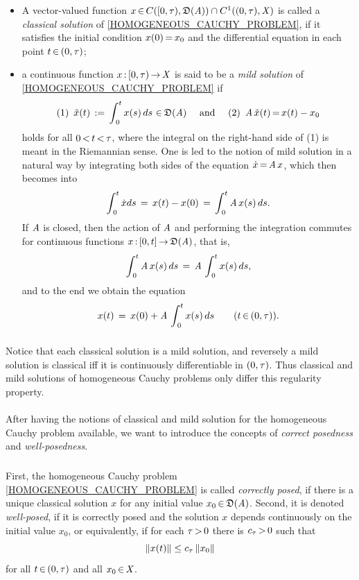 \documentclass[11pt,twoside]{article}
\begin{document}
\begin{itemize}[leftmargin=12pt]
\item[1.]
A vector-valued function
$x {\,\in\,} C([0,\tau),\mathfrak{D}(\mathit{A})) \cap C^1((0,\tau),\mathit{X})$
is called a \textit{classical solution} of \eqref{HOMOGENEOUS_CAUCHY_PROBLEM},
if it satisfies the initial condition $x(0) {\,=\,} x_0$
and the differential equation in each point $t {\,\in\,} (0,\tau)$;

\item[2.]
a continuous function $x {\,:\,} [0,\tau) {\,\to\,} \mathit{X}$ is said to be
a \textit{mild solution} of \eqref{HOMOGENEOUS_CAUCHY_PROBLEM} if
\[
\mbox{(1) } \, \tilde{x}(t) \,:=\,
\int_{\,0}^t x(s) \, ds \, {\,\in\,} \mathfrak{D}(\mathit{A})
\quad \mbox{ and } \quad
\mbox{(2) } \, \mathit{A} \, \tilde{x}(t) {\,=\,} x(t)-x_0
\]
holds for all $0 {\,<\,} t {\,<\,} \tau$,
where the integral on the right-hand side of (1) 
is meant in the Riemannian sense.
One is led to the notion of mild solution in a natural way
by integrating both sides of the equation $\dot{x} {\,=\,} \mathit{A} \, x$,
which then becomes into
\[
\int_{\,0}^t \dot{x} ds \,=\,
x(t)-x(0) \,=\, 
\int_{\,0}^t \mathit{A} \, x(s) \, ds.
\]
If $\mathit{A}$ is closed,
then the action of $\mathit{A}$ and performing the integration commutes
for continuous functions $x {\,:\,} [0,t] {\,\to\,} \mathfrak{D}(\mathit{A})$,
that is,
\[
\int_{\,0}^t \mathit{A} \, x(s) \, ds  \,=\, \mathit{A} \, \int_{\,0}^t x(s) \, ds,
\]
and to the end we obtain the equation
\[
x(t) \,=\, x(0) + \mathit{A} \, \int_{\,0}^t x(s) \,ds
\quad \quad (t {\,\in\,} (0,\tau)).
\]
\end{itemize}

\subparagraph{} %
Notice that each classical solution is a mild solution,
and reversely a mild solution is classical
iff it is continuously differentiable in $(0,\tau)$.
Thus classical and mild solutions of homogeneous Cauchy problems
only differ {\wrt} this regularity property.

\paragraph{} %
After having the notions of classical and mild solution for the homogeneous
Cauchy problem available,
we want to introduce the concepts of \textit{correct posedness} and
\textit{well-posedness}.

\subparagraph{} %
First,
the homogeneous Cauchy problem \eqref{HOMOGENEOUS_CAUCHY_PROBLEM}
is called \textit{correctly posed},
if there is a unique classical solution $x$
for any initial value $x_0 {\,\in\,} \mathfrak{D}(\mathit{A})$.
Second,
it is denoted \textit{well-posed},
if it is correctly posed and
the solution $x$ depends continuously on the initial value $x_0$,
or equivalently,
if for each $\tau {\,>\,} 0$ there is $c_{\tau} {\,>\,} 0$ such that
\[
\left\lVert x(t) \right\rVert \leq c_{\tau} \left\lVert x_0 \right\rVert
\]
for all $t {\,\in\,} (0,\tau)$ and all $x_0 {\,\in\,} \mathit{X}$.
\end{document}
